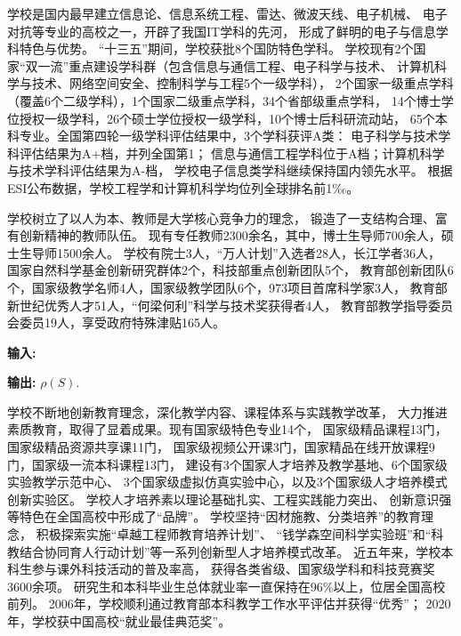 \par
学校是国内最早建立信息论、信息系统工程、雷达、微波天线、电子机械、
电子对抗等专业的高校之一，开辟了我国IT学科的先河，
形成了鲜明的电子与信息学科特色与优势。
“十三五”期间，学校获批8个国防特色学科。
学校现有2个国家“双一流”重点建设学科群（包含信息与通信工程、电子科学与技术、
计算机科学与技术、网络空间安全、控制科学与工程5个一级学科），
2个国家一级重点学科（覆盖6个二级学科），1个国家二级重点学科，34个省部级重点学科，
14个博士学位授权一级学科，26个硕士学位授权一级学科，10个博士后科研流动站，
65个本科专业。全国第四轮一级学科评估结果中，3个学科获评A类：
电子科学与技术学科评估结果为A+档，并列全国第1；
信息与通信工程学科位于A档；计算机科学与技术学科评估结果为A-档，
学校电子信息类学科继续保持国内领先水平。
根据ESI公布数据，学校工程学和计算机科学均位列全球排名前1‰。
\par
学校树立了以人为本、教师是大学核心竞争力的理念，
锻造了一支结构合理、富有创新精神的教师队伍。
现有专任教师2300余名，其中，博士生导师700余人，硕士生导师1500余人。
学校有院士3人，“万人计划”入选者28人，长江学者36人，
国家自然科学基金创新研究群体2个，科技部重点创新团队5个，
教育部创新团队6个，国家级教学名师4人，国家级教学团队6个，973项目首席科学家3人，
教育部新世纪优秀人才51人，“何梁何利”科学与技术奖获得者4人，
教育部教学指导委员会委员19人，享受政府特殊津贴165人。
\begin{algorithm}[H]
    \caption{}
    \label{}
    \hspace*{0.02in} {\bf 输入:} 
    
    \hspace*{0.02in} {\bf 输出:}
    $\rho(S)$.
    \begin{algorithmic}[1]
    \end{algorithmic}
   \end{algorithm}
\par
学校不断地创新教育理念，深化教学内容、课程体系与实践教学改革，
大力推进素质教育，取得了显着成果。现有国家级特色专业14个，
国家级精品课程13门，国家级精品资源共享课11门，
国家级视频公开课3门，国家精品在线开放课程9门，国家级一流本科课程13门，
建设有3个国家人才培养及教学基地、6个国家级实验教学示范中心、
3个国家级虚拟仿真实验中心，以及3个国家级人才培养模式创新实验区。
学校人才培养素以理论基础扎实、工程实践能力突出、
创新意识强等特色在全国高校中形成了“品牌”。
学校坚持“因材施教、分类培养”的教育理念，
积极探索实施“卓越工程师教育培养计划”、
“钱学森空间科学实验班”和“科教结合协同育人行动计划”等一系列创新型人才培养模式改革。
近五年来，学校本科生参与课外科技活动的普及率高，
获得各类省级、国家级学科和科技竞赛奖3600余项。
研究生和本科毕业生总体就业率一直保持在96\%以上，位居全国高校前列。
2006年，学校顺利通过教育部本科教学工作水平评估并获得“优秀”；
2020年，学校获中国高校“就业最佳典范奖”。
